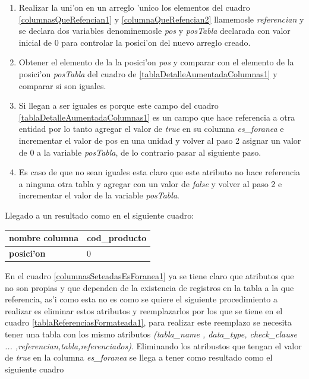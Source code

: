\begin{enumerate}
\item Realizar la uni'on en un arreglo 'unico los elementos del cuadro \ref{columnasQueRefencian1} y \ref{columnaQueRefencian2} llamemosle \textit{referencian} y se declara dos variables denominemosle \textit{pos} y \textit{posTabla} declarada con valor inicial de 0 para controlar la posici'on del nuevo arreglo creado.
\item Obtener el elemento de la la posici'on \textit{pos} y comparar con el elemento de la posici'on \textit{posTabla} del cuadro de \ref{tablaDetalleAumentadaColumnas1} y comparar si son iguales.
\item Si llegan a ser iguales es porque este campo del cuadro \ref{tablaDetalleAumentadaColumnas1} es un campo que hace referencia a otra entidad por lo tanto agregar el valor de \textit{true} en su columna \textit{es\_foranea} e incrementar el valor de pos en una unidad y volver al paso 2 asignar un valor de 0 a la variable \textit{posTabla}, de lo contrario pasar al siguiente paso.
\item Es caso de que no sean iguales esta claro que este atributo no hace referencia a ninguna otra tabla y agregar con un valor de \textit{false} y volver al paso 2 e incrementar el valor de la variable \textit{posTabla}.
\end{enumerate}
Llegado a un resultado como en el siguiente cuadro:

 
\begin{center}
  \label{columnasSeteadasEsForanea1} %
  \begin{tabular}{|l|l|}
  \hline 
  \textbf{nombre columna} & cod\_producto \\ \hline
  \textbf{posici'on}      & 0             \\ \hline
  \end{tabular}
\end{center}

En el cuadro \ref{columnasSeteadasEsForanea1} ya se tiene claro que atributos que no son propias y que dependen de la existencia de registros en la tabla a la que referencia, as'i como esta no es como se quiere el siguiente procedimiento a realizar es eliminar estos atributos y reemplazarlos por los que se tiene en el cuadro \ref{tablaReferenciasFormateada1}, para realizar este reemplazo se necesita tener una tabla con los mismo atributos \textit{(tabla\_name , data\_type, check\_clause ... ,referencian,tabla,referenciados)}. Eliminando los atribustos que tengan el valor de \textit{true} en la columna \textit{es\_foranea} se llega a tener como resultado como el siguiente cuadro

